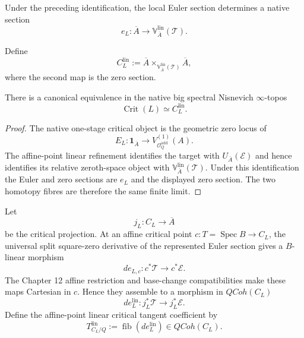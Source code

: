 Under the preceding identification, the local Euler section determines a native
section
\[
e_L:
\overline A
\longrightarrow
\mathbb V_{\overline A}^{\mathrm{lin}}(\mathcal T).
\]

\begin{construction}
\label{constr:symmetry-noether-affine-point-euler-zero-locus}
Define
\[
\boxed{
C_L^{\mathrm{lin}}
:=
\overline A
\times_{\mathbb V_{\overline A}^{\mathrm{lin}}(\mathcal T)}
\overline A,
}
\]
where the second map is the zero section.
\end{construction}

\begin{theorem}
\label{thm:symmetry-noether-the-native-critical-object-is-the-affine-point-euler-zero-locus}
There is a canonical equivalence in the native big spectral Nisnevich
$\infty$-topos
\[
\boxed{
\operatorname{Crit}(L)
\simeq
C_L^{\mathrm{lin}}.
}
\]
\end{theorem}

\begin{proof}
The native one-stage critical object is the geometric zero locus of
\[
E_L:
\mathbf1_{\overline A}
\longrightarrow
V_{\mathcal O_Q^{\mathrm{add}}}^{(1)}(A).
\]
The affine-point linear refinement identifies the target with
$U_{\overline A}(\mathcal E)$ and hence identifies its relative zeroth-space object
with
$\mathbb V_{\overline A}^{\mathrm{lin}}(\mathcal T)$.
Under this identification the Euler and zero sections are $e_L$ and the displayed
zero section.  The two homotopy fibres are therefore the same finite limit.
\end{proof}

\begin{construction}
\label{constr:symmetry-noether-affine-point-euler-linearization}
Let
\[
j_L:C_L\longrightarrow\overline A
\]
be the critical projection.  At an affine critical point
$c:T=\operatorname{Spec}B\to C_L$, the universal split square-zero derivative of
the represented Euler section gives a $B$-linear morphism
\[
de_{L,c}:
c^*\mathcal T
\longrightarrow
c^*\mathcal E.
\]
The Chapter 12 affine restriction and base-change compatibilities make these maps
Cartesian in $c$.  Hence they assemble to a morphism in $QCoh(C_L)$
\[
\boxed{
de_L^{\mathrm{lin}}:
j_L^*\mathcal T
\longrightarrow
j_L^*\mathcal E.
}
\]
Define the affine-point linear critical tangent coefficient by
\[
\boxed{
T_{C_L/Q}^{\mathrm{lin}}
:=
\operatorname{fib}
\left(
de_L^{\mathrm{lin}}
\right)
\in QCoh(C_L).
}
\]
\end{construction}

